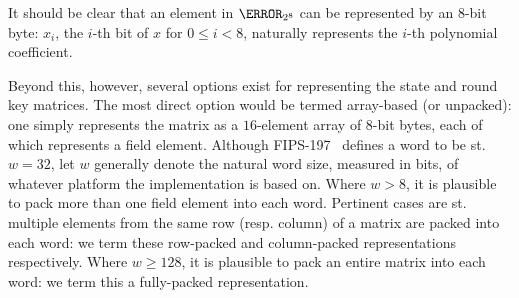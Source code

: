 
It should be clear that an element in $\F_{2^8}$ can be represented by an
$8$-bit byte: $x_i$, the $i$-th bit of $x$ for $0 \leq i < 8$, naturally 
represents the $i$-th polynomial coefficient.

Beyond this, however, several options exist for representing the state and
round key matrices.  The most direct option would be termed
 array-based (or unpacked):
one simply represents the matrix as a $16$-element array of $8$-bit bytes, 
each of which represents a field element.
Although FIPS-197~\cite{FIPS:197} defines a word to be st. $w = 32$, let
$w$ generally denote the natural word size, measured in bits, of whatever
platform the implementation is based on.
Where $w >      8$,
it is plausible to pack
more than one field element 
into each word.  
Pertinent cases are st. multiple elements from the same row (resp. column) 
of a matrix are packed into each word:
we term these
   row-packed  
and
column-packed
representations respectively.
Where $w \geq 128$, 
it is plausible to pack
an entire matrix
into each word: 
we term this a 
 fully-packed 
representation.

